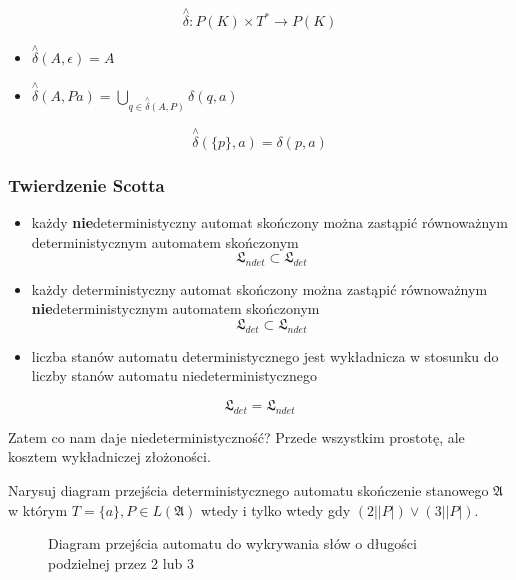 \documentclass{../notatki}
\begin{document}
$$
\stackrel{\wedge}{\delta}: P(K) \times T^* \rightarrow P(K)
$$

\begin{itemize}
    \item $\stackrel{\wedge}{\delta}(A, \epsilon) = A$
    \item $\stackrel{\wedge}{\delta}(A, Pa) = \bigcup_{q \in \stackrel{\wedge}{\delta}(A, P)}\delta(q, a)$
\end{itemize}

$$
\stackrel{\wedge}{\delta}(\{p\}, a) = \delta(p, a)
$$

\subsubsection{Twierdzenie Scotta}

\begin{itemize}
    \item każdy \textbf{nie}deterministyczny automat skończony można zastąpić równoważnym deterministycznym automatem skończonym
    $$\mathfrak{L}_{ndet} \subset \mathfrak{L}_{det}$$
    \item każdy deterministyczny automat skończony można zastąpić równoważnym \textbf{nie}deterministycznym automatem skończonym
    $$\mathfrak{L}_{det} \subset \mathfrak{L}_{ndet}$$
    \item liczba stanów automatu deterministycznego jest wykładnicza w stosunku do liczby stanów automatu niedeterministycznego
\end{itemize}

$$\mathfrak{L}_{det} = \mathfrak{L}_{ndet}$$

Zatem co nam daje niedeterministyczność? Przede wszystkim prostotę, ale kosztem wykładniczej złożoności.

Narysuj diagram przejścia deterministycznego automatu skończenie stanowego $\mathfrak{A}$ w którym $T=\{a\}, P \in L(\mathfrak{A})$ wtedy i tylko wtedy gdy $(2 | |P|) \vee (3 | |P|)$.

\begin{figure}
    \centering
    \caption{Diagram przejścia automatu do wykrywania słów o długości podzielnej przez 2 lub 3}
    \label{fig:automat:2or3}
\end{figure}
\end{document}
